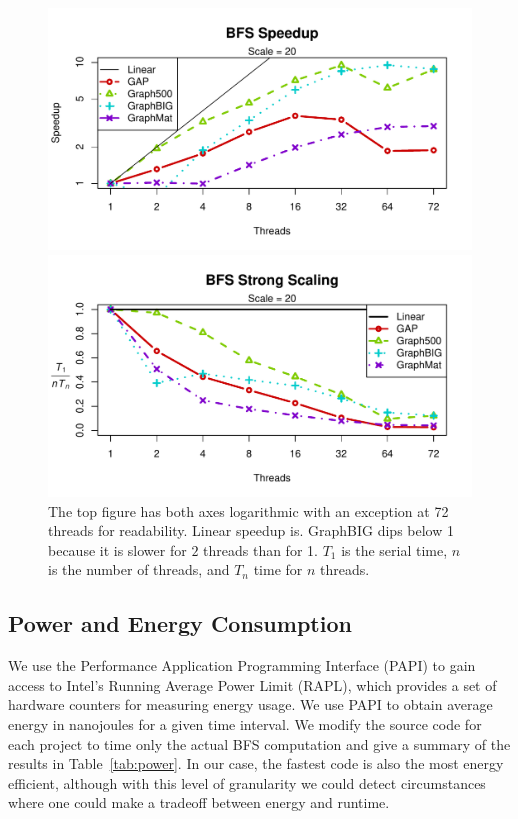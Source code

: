 \documentclass{llncs}
\begin{document}
\begin{figure}
	\centering
	\begin{minipage}{\linewidth}
		\includegraphics[width=\linewidth, trim=0 18pt 18pt 12pt, clip]{graphics/bfs_speedup.pdf}
	\end{minipage}
	\begin{minipage}{\linewidth}
		\includegraphics[width=\linewidth, trim=0 18pt 18pt 12pt, clip]{graphics/bfs_ss.pdf}
	\end{minipage}
	\caption{The top figure has both axes logarithmic with an exception at 72 threads for readability. Linear speedup is. GraphBIG dips below 1 because it is slower for $2$ threads than for 1. $T_1$ is the serial time, $n$ is the number of threads, and $T_n$ time for $n$ threads.}
	\label{fig:bfs-scaling}
\end{figure}

\subsection{Power and Energy Consumption}
We use the Performance Application Programming Interface (PAPI) \cite{Browne:2000:PAPI} to gain access to Intel's Running Average Power Limit (RAPL), which provides a set of hardware counters for measuring energy usage. We use PAPI to obtain average energy in nanojoules for a given time interval. We modify the source code for each project to time only the actual BFS computation and give a summary of the results in Table~\ref{tab:power}. In our case, the fastest code is also the most energy efficient, although with this level of granularity we could detect circumstances where one could make a tradeoff between energy and runtime.
\end{document}
